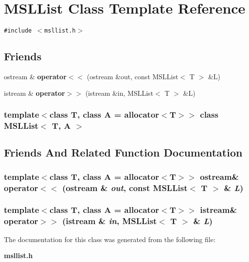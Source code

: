 \section{MSLList  Class Template Reference}
\label{classMSLList}
{\tt \#include $<$msllist.h$>$}

\subsection*{Friends}
\begin{CompactItemize}
\item 
ostream \& {\bf operator$<$$<$} (ostream \&out, const MSLList$<$ T $>$ \&L)
\item 
istream \& {\bf operator$>$$>$} (istream \&in, MSLList$<$ T $>$ \&L)
\end{CompactItemize}
\subsubsection*{template$<$class T, class A = allocator$<$T$>$$>$ class MSLList$<$ T, A $>$}



\subsection{Friends And Related Function Documentation}
\subsubsection{\setlength{\rightskip}{0pt plus 5cm}template$<$class T, class A = allocator$<$T$>$$>$ ostream\& operator$<$$<$ (ostream \& {\em out}, const MSLList$<$ T $>$ \& {\em L})\hspace{0.3cm}{\tt  [friend]}}\label{classMSLList_l0}


\subsubsection{\setlength{\rightskip}{0pt plus 5cm}template$<$class T, class A = allocator$<$T$>$$>$ istream\& operator$>$$>$ (istream \& {\em in}, MSLList$<$ T $>$ \& {\em L})\hspace{0.3cm}{\tt  [friend]}}\label{classMSLList_l1}




The documentation for this class was generated from the following file:\begin{CompactItemize}
\item 
{\bf msllist.h}\end{CompactItemize}
